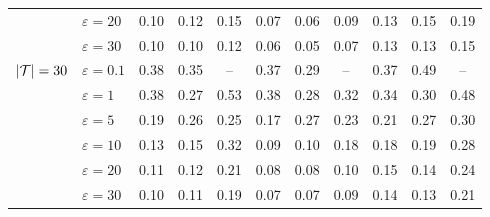 \begin{table*}[htbp]
{\begin{tabular}{llccccccccc}
                                & $\varepsilon = 20$  & 0.10    & 0.12   & 0.15   & 0.07    & 0.06    & 0.09   & 0.13       & 0.15       & 0.19      \\
                                & $\varepsilon = 30$  & 0.10    & 0.10   & 0.12   & 0.06    & 0.05    & 0.07   & 0.13       & 0.13       & 0.15      \\
\midrule
\multirow{6}{*}{$\lvert \mathcal{T} \rvert = 30$} & $\varepsilon = 0.1$ & 0.38    & 0.35   & --   & 0.37    & 0.29    & --   & 0.37       & 0.49       & --      \\
                                & $\varepsilon = 1$   & 0.38    & 0.27   & 0.53   & 0.38    & 0.28    & 0.32   & 0.34       & 0.30       & 0.48      \\
                                & $\varepsilon = 5$   & 0.19    & 0.26   & 0.25   & 0.17    & 0.27    & 0.23   & 0.21       & 0.27       & 0.30      \\
                                & $\varepsilon = 10$  & 0.13    & 0.15   & 0.32   & 0.09    & 0.10    & 0.18   & 0.18       & 0.19       & 0.28      \\
                                & $\varepsilon = 20$  & 0.11    & 0.12   & 0.21   & 0.08    & 0.08    & 0.10   & 0.15       & 0.14       & 0.24      \\
                                & $\varepsilon = 30$  & 0.10    & 0.11   & 0.19   & 0.07    & 0.07    & 0.09   & 0.14       & 0.13       & 0.21      \\
\bottomrule
\end{tabular}%
}
\end{table*}
